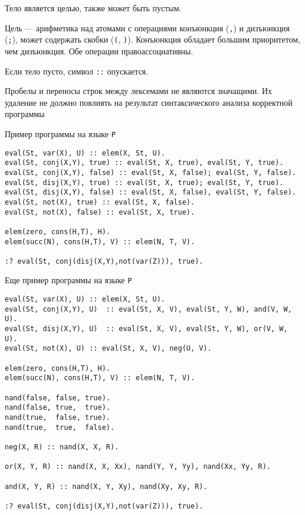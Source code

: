 \documentclass[12pt]{article}
\begin{document}
Тело является целью, также может быть пустым.

Цель --- арифметика над атомами с операциями конъюнкция (\verb!,!) и дизъюнкция (\verb!;!), может содержать скобки (\verb!(!, \verb!)!). Конъюнкция обладает большим приоритетом, чем дизъюнкция. Обе операции правоассоциативны.

Если тело пусто, символ \verb!::! опускается.

Пробелы и переносы строк между лексемами не являются значащими. Их удаление не должно повлиять на результат синтаксического анализа корректной программы

\newpage

\begin{center}
    \Large{Пример программы на языке \verb!P!}
\end{center}

\begin{verbatim}
eval(St, var(X), U) :: elem(X, St, U).
eval(St, conj(X,Y), true) :: eval(St, X, true), eval(St, Y, true).
eval(St, conj(X,Y), false) :: eval(St, X, false); eval(St, Y, false).
eval(St, disj(X,Y), true) :: eval(St, X, true); eval(St, Y, true).
eval(St, disj(X,Y), false) :: eval(St, X, false), eval(St, Y, false).
eval(St, not(X), true) :: eval(St, X, false).
eval(St, not(X), false) :: eval(St, X, true).

elem(zero, cons(H,T), H).
elem(succ(N), cons(H,T), V) :: elem(N, T, V).

:? eval(St, conj(disj(X,Y),not(var(Z))), true).
\end{verbatim}

\begin{center}
  \Large{Еще пример программы на языке \verb!P!}
\end{center}

\begin{verbatim}
eval(St, var(X), U) :: elem(X, St, U).
eval(St, conj(X,Y), U)  :: eval(St, X, V), eval(St, Y, W), and(V, W, U).
eval(St, disj(X,Y), U)  :: eval(St, X, V), eval(St, Y, W), or(V, W, U).
eval(St, not(X), U) :: eval(St, X, V), neg(U, V).

elem(zero, cons(H,T), H).
elem(succ(N), cons(H,T), V) :: elem(N, T, V).

nand(false, false, true).
nand(false, true,  true).
nand(true,  false, true).
nand(true,  true,  false).

neg(X, R) :: nand(X, X, R).

or(X, Y, R) :: nand(X, X, Xx), nand(Y, Y, Yy), nand(Xx, Yy, R).

and(X, Y, R) :: nand(X, Y, Xy), nand(Xy, Xy, R).

:? eval(St, conj(disj(X,Y),not(var(Z))), true).
\end{verbatim}
\end{document}
